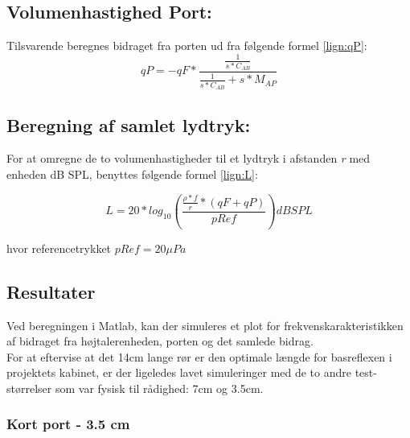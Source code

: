 



\subsection{Volumenhastighed Port:}

Tilsvarende beregnes bidraget fra porten ud fra følgende formel \ref{lign:qP}:
\begin{equation}\label{lign:qP}
	qP=-qF* \frac{\frac{1}{s*C_{AB}}}{\frac{1}{s*C_{AB}}+s*M_{AP}} 	
\end{equation}



\subsection{Beregning af samlet lydtryk:}

For at omregne de to volumenhastigheder til et lydtryk i afstanden \textit{r} med enheden dB SPL, benyttes følgende formel \ref{lign:L}:

\begin{equation}\label{lign:L}
	L=20*log_{10}(\frac{\frac{\rho*f}{r}*(qF+qP)}{pRef}) dB SPL
\end{equation}

hvor referencetrykket $pRef=20  \mu Pa$


\subsection{Resultater}

Ved beregningen i Matlab, kan der simuleres et plot for frekvenskarakteristikken af bidraget fra højtalerenheden, porten og det samlede bidrag. \\
For at eftervise at det 14cm lange rør er den optimale længde for basreflexen i projektets kabinet, er der ligeledes lavet simuleringer med de to andre test-størrelser som var fysisk til rådighed: 7cm og 3.5cm.

\subsubsection{Kort port - 3.5 cm}


